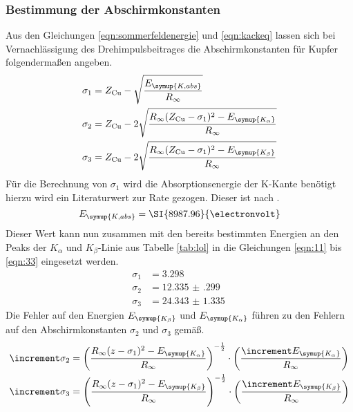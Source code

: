 \subsubsection{Bestimmung der Abschirmkonstanten}
Aus den Gleichungen \eqref{eqn:sommerfeldenergie} und \eqref{eqn:kackeq} lassen sich bei Vernachlässigung des Drehimpulsbeitrages die Abschirmkonstanten für Kupfer folgendermaßen angeben.
\begin{align}
\label{eqn:11}
\sigma_1 &= Z_{\text{Cu}} - \sqrt{\frac{E_{\symup{K,abs}}}{R_{\infty}} } \\
\sigma_2 &= Z_{\text{Cu}} - 2 \sqrt{\frac{R_{\infty}(Z_{\text{Cu}} - \sigma_1)^2 - E_{\symup{K_{\alpha}}}}{R_{\infty}}} \\
\label{eqn:33}
\sigma_3 &= Z_{\text{Cu}} - 2 \sqrt{\frac{R_{\infty}(Z_{\text{Cu}} - \sigma_1)^2 - E_{\symup{K_{\beta}}}}{R_{\infty}}} 
\end{align}
Für die Berechnung von $\sigma_1$ wird die Absorptionsenergie der K-Kante benötigt hierzu wird ein Literaturwert zur Rate gezogen.
Dieser ist nach \cite{random}.
\begin{equation*}
E_{\symup{K,abs}} = \SI{8987.96}{\electronvolt}
\end{equation*}
Dieser Wert kann nun zusammen mit den bereits bestimmten Energien an den Peaks der $K_{\alpha}$ und $K_{\beta}$-Linie aus Tabelle \ref{tab:lol} in die Gleichungen \eqref{eqn:11} bis
\eqref{eqn:33} eingesetzt werden.
\begin{align*}
\sigma_1 &= \SI{3.298}{}\\
\sigma_2 &= \SI{12.335(299)}{}\\
\sigma_3 &= \SI{24.343(1335)}{}
\end{align*}
Die Fehler auf den Energien $E_{\symup{K_{\beta}}}$ und $E_{\symup{K_{\alpha}}}$ führen zu den Fehlern auf den Abschirmkonstanten $\sigma_{2}$ und $\sigma_{3}$ gemäß.
\begin{align*}
\increment \sigma_{2} &= \left( \frac{R_{\infty}(z - \sigma_{1})^{2} - E_{\symup{K_{\alpha}}}}{R_{\infty}}\right)^{-\frac{1}{2}} \cdot \left( \frac{\increment E_{\symup{K_{\alpha}}}}{R_{\infty}}\right) \\
\increment \sigma_{3} &= \left( \frac{R_{\infty}(z - \sigma_{1})^{2} - E_{\symup{K_{\beta}}}}{R_{\infty}}\right)^{-\frac{1}{2}} \cdot \left( \frac{\increment E_{\symup{K_{\beta}}}}{R_{\infty}}\right)
\end{align*}
